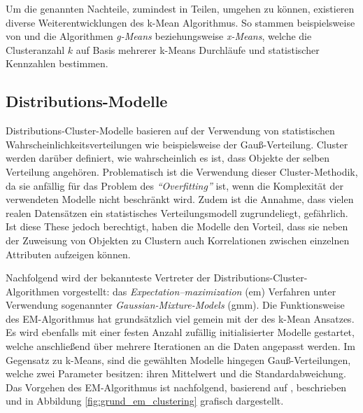 Um die genannten Nachteile, zumindest in Teilen, umgehen zu können, existieren diverse Weiterentwicklungen des k-Mean
Algorithmus. So stammen beispielsweise von \cite[]{Hamerly} und \cite[]{Pelleg} die Algorithmen \textit{g-Means}
beziehungsweise \textit{x-Means}, welche die Clusteranzahl $k$ auf Basis mehrerer k-Means Durchläufe und
statistischer Kennzahlen bestimmen.

\subsection{Distributions-Modelle}
\label{sec:grund_distribution_clustering}

Distributions-Cluster-Modelle basieren auf der Verwendung von statistischen Wahrscheinlichkeitsverteilungen wie
beispielsweise der Gauß-Verteilung. Cluster werden darüber definiert, wie wahrscheinlich es ist, dass Objekte
der selben Verteilung angehören. Problematisch ist die Verwendung dieser Cluster-Methodik, da sie anfällig für
das Problem des \textit{``Overfitting''} ist, wenn die Komplexität der verwendeten Modelle nicht beschränkt wird.
Zudem ist die Annahme, dass vielen realen Datensätzen ein statistisches Verteilungsmodell zugrundeliegt, gefährlich.
Ist diese These jedoch berechtigt, haben die Modelle den Vorteil, dass sie neben der Zuweisung von Objekten zu Clustern
auch Korrelationen zwischen einzelnen Attributen aufzeigen können. \cite[]{AndersDrachen2014}

Nachfolgend wird der bekannteste Vertreter der Distributions-Cluster-Algorithmen vorgestellt:
das \textit{Expectation–maximization} (\acrshort*{em}) Verfahren unter Verwendung sogenannter \textit{Gaussian-Mixture-Models} (\acrshort*{gmm}).
Die Funktionsweise des EM-Algorithmus hat grundsätzlich viel gemein mit der des k-Mean Ansatzes.
Es wird ebenfalls mit einer festen Anzahl zufällig initialisierter Modelle gestartet, welche anschließend über mehrere Iterationen
an die Daten angepasst werden. Im Gegensatz zu k-Means, sind die gewählten Modelle hingegen Gauß-Verteilungen,
welche zwei Parameter besitzen: ihren Mittelwert und die Standardabweichung.
Das Vorgehen des EM-Algorithmus ist nachfolgend, basierend auf \cite[]{GeorgeSeif2018}, beschrieben und in
Abbildung \ref{fig:grund_em_clustering} grafisch dargestellt.

